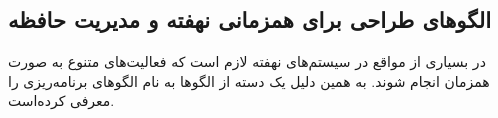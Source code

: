 \subsection{الگوهای طراحی برای همزمانی نهفته و مدیریت حافظه}
\begin{RTL}
در بسیاری از مواقع در سیستم‌های نهفته لازم است که فعالیت‌های متنوع به صورت همزمان
انجام شوند. به همین دلیل 
\cite{ref1} یک دسته از الگوها به نام الگوهای برنامه‌ریزی
را معرفی کرده‌است.
\end{RTL}







